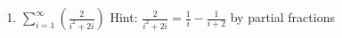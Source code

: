 \documentclass[noinstructornotes]{ximera}
\begin{document}
\begin{problem}
\begin{enumerate}
%	
	
	
	\item  $\sum_{i=1}^\infty \left( \frac{2}{i^2+2i}  \right)$  
	Hint: $\frac{2}{i^2+2i} = \frac{1}{i} - \frac{1}{i+2}$ by partial fractions
	

\end{enumerate}
\end{problem}
\end{document}
